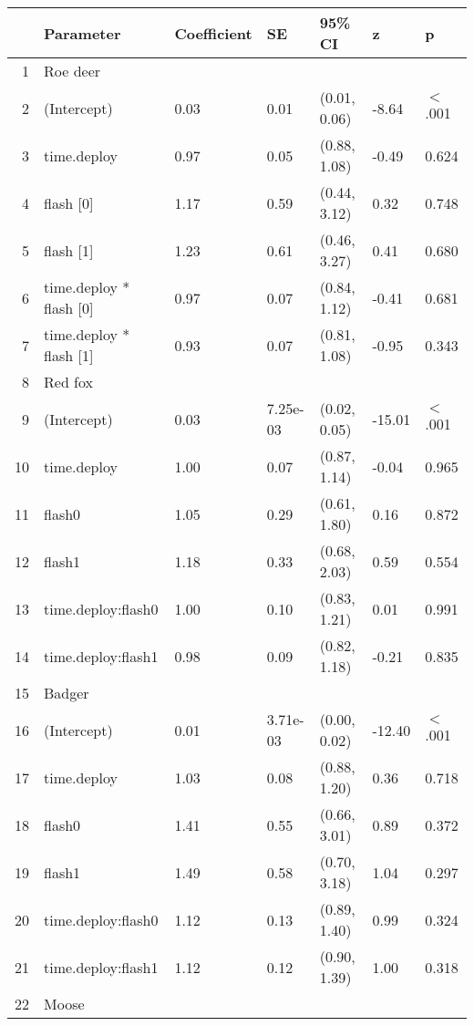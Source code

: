 \begin{table}[ht]
\centering
\begin{tabular}{rllllll}
  \hline
 & Parameter & Coefficient & SE & 95\% CI & z & p \\ 
  \hline
1 & Roe deer &  &  &  &  &        \\ 
  2 & (Intercept) & 0.03 & 0.01 & (0.01, 0.06) & -8.64 & $<$ .001 \\ 
  3 & time.deploy & 0.97 & 0.05 & (0.88, 1.08) & -0.49 & 0.624  \\ 
  4 & flash [0] & 1.17 & 0.59 & (0.44, 3.12) & 0.32 & 0.748  \\ 
  5 & flash [1] & 1.23 & 0.61 & (0.46, 3.27) & 0.41 & 0.680  \\ 
  6 & time.deploy * flash [0] & 0.97 & 0.07 & (0.84, 1.12) & -0.41 & 0.681  \\ 
  7 & time.deploy * flash [1] & 0.93 & 0.07 & (0.81, 1.08) & -0.95 & 0.343  \\ 
  8 & Red fox &  &  &  &  &        \\ 
  9 & (Intercept) & 0.03 & 7.25e-03 & (0.02, 0.05) & -15.01 & $<$ .001 \\ 
  10 & time.deploy & 1.00 & 0.07 & (0.87, 1.14) & -0.04 & 0.965  \\ 
  11 & flash0 & 1.05 & 0.29 & (0.61, 1.80) & 0.16 & 0.872  \\ 
  12 & flash1 & 1.18 & 0.33 & (0.68, 2.03) & 0.59 & 0.554  \\ 
  13 & time.deploy:flash0 & 1.00 & 0.10 & (0.83, 1.21) & 0.01 & 0.991  \\ 
  14 & time.deploy:flash1 & 0.98 & 0.09 & (0.82, 1.18) & -0.21 & 0.835  \\ 
  15 & Badger &  &  &  &  &        \\ 
  16 & (Intercept) & 0.01 & 3.71e-03 & (0.00, 0.02) & -12.40 & $<$ .001 \\ 
  17 & time.deploy & 1.03 & 0.08 & (0.88, 1.20) & 0.36 & 0.718  \\ 
  18 & flash0 & 1.41 & 0.55 & (0.66, 3.01) & 0.89 & 0.372  \\ 
  19 & flash1 & 1.49 & 0.58 & (0.70, 3.18) & 1.04 & 0.297  \\ 
  20 & time.deploy:flash0 & 1.12 & 0.13 & (0.89, 1.40) & 0.99 & 0.324  \\ 
  21 & time.deploy:flash1 & 1.12 & 0.12 & (0.90, 1.39) & 1.00 & 0.318  \\ 
  22 & Moose &  &  &  &  &        \\ 

\end{tabular}
\end{table}
